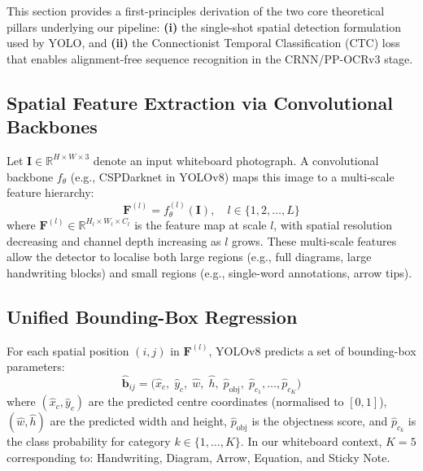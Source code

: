 \documentclass[11pt, a4paper]{article}
\newcommand{\Reals}{\mathbb{R}}
\begin{document}
This section provides a first-principles derivation of the two core theoretical pillars underlying our pipeline: \textbf{(i)} the single-shot spatial detection formulation used by YOLO, and \textbf{(ii)} the Connectionist Temporal Classification (CTC) loss that enables alignment-free sequence recognition in the CRNN/PP-OCRv3 stage.

\subsection{Spatial Feature Extraction via Convolutional Backbones}\label{sec:cnn_features}

Let $\mathbf{I} \in \Reals^{H \times W \times 3}$ denote an input whiteboard photograph. A convolutional backbone $f_\theta$ (e.g., CSPDarknet in YOLOv8) maps this image to a multi-scale feature hierarchy:
\begin{equation}\label{eq:feature_extraction}
  \mathbf{F}^{(l)} = f_\theta^{(l)}(\mathbf{I}), \quad l \in \{1, 2, \ldots, L\}
\end{equation}
where $\mathbf{F}^{(l)} \in \Reals^{H_l \times W_l \times C_l}$ is the feature map at scale $l$, with spatial resolution decreasing and channel depth increasing as $l$ grows. These multi-scale features allow the detector to localise both large regions (e.g., full diagrams, large handwriting blocks) and small regions (e.g., single-word annotations, arrow tips).

\subsection{Unified Bounding-Box Regression}\label{sec:bbox_regression}

For each spatial position $(i, j)$ in $\mathbf{F}^{(l)}$, YOLOv8 predicts a set of bounding-box parameters:
\begin{equation}\label{eq:yolo_output}
  \hat{\mathbf{b}}_{ij} = \bigl(\hat{x}_c,\; \hat{y}_c,\; \hat{w},\; \hat{h},\; \hat{p}_{\text{obj}},\; \hat{p}_{c_1}, \ldots, \hat{p}_{c_K}\bigr)
\end{equation}
where $(\hat{x}_c, \hat{y}_c)$ are the predicted centre coordinates (normalised to $[0,1]$), $(\hat{w}, \hat{h})$ are the predicted width and height, $\hat{p}_{\text{obj}}$ is the objectness score, and $\hat{p}_{c_k}$ is the class probability for category $k \in \{1, \ldots, K\}$. In our whiteboard context, $K = 5$ corresponding to: Handwriting, Diagram, Arrow, Equation, and Sticky Note.
\end{document}
